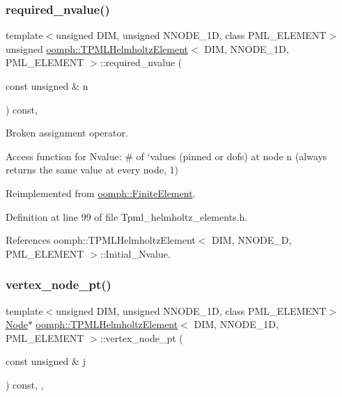\subsubsection{\texorpdfstring{required\+\_\+nvalue()}{required\_nvalue()}}
{\footnotesize\ttfamily template$<$unsigned D\+IM, unsigned N\+N\+O\+D\+E\+\_\+1D, class P\+M\+L\+\_\+\+E\+L\+E\+M\+E\+NT$>$ \\
unsigned \hyperlink{classoomph_1_1TPMLHelmholtzElement}{oomph\+::\+T\+P\+M\+L\+Helmholtz\+Element}$<$ D\+IM, N\+N\+O\+D\+E\+\_\+1D, P\+M\+L\+\_\+\+E\+L\+E\+M\+E\+NT $>$\+::required\+\_\+nvalue (\begin{DoxyParamCaption}\item[{const unsigned \&}]{n }\end{DoxyParamCaption}) const\hspace{0.3cm}{\ttfamily [inline]}, {\ttfamily [virtual]}}



Broken assignment operator. 

Access function for Nvalue\+: \# of `values\textquotesingle{} (pinned or dofs) at node n (always returns the same value at every node, 1) 

Reimplemented from \hyperlink{classoomph_1_1FiniteElement_a56610c60d5bc2d7c27407a1455471b1a}{oomph\+::\+Finite\+Element}.



Definition at line 99 of file Tpml\+\_\+helmholtz\+\_\+elements.\+h.



References oomph\+::\+T\+P\+M\+L\+Helmholtz\+Element$<$ D\+I\+M, N\+N\+O\+D\+E\+\_\+D, P\+M\+L\+\_\+\+E\+L\+E\+M\+E\+N\+T $>$\+::\+Initial\+\_\+\+Nvalue.

\mbox{\label{classoomph_1_1TPMLHelmholtzElement_aa2dd0b64b0f05ecea77f77032e9167c5}} 
\subsubsection{\texorpdfstring{vertex\+\_\+node\+\_\+pt()}{vertex\_node\_pt()}}
{\footnotesize\ttfamily template$<$unsigned D\+IM, unsigned N\+N\+O\+D\+E\+\_\+1D, class P\+M\+L\+\_\+\+E\+L\+E\+M\+E\+NT$>$ \\
\hyperlink{classoomph_1_1Node}{Node}$\ast$ \hyperlink{classoomph_1_1TPMLHelmholtzElement}{oomph\+::\+T\+P\+M\+L\+Helmholtz\+Element}$<$ D\+IM, N\+N\+O\+D\+E\+\_\+1D, P\+M\+L\+\_\+\+E\+L\+E\+M\+E\+NT $>$\+::vertex\+\_\+node\+\_\+pt (\begin{DoxyParamCaption}\item[{const unsigned \&}]{j }\end{DoxyParamCaption}) const\hspace{0.3cm}{\ttfamily [inline]}, {\ttfamily [protected]}, {\ttfamily [virtual]}}



